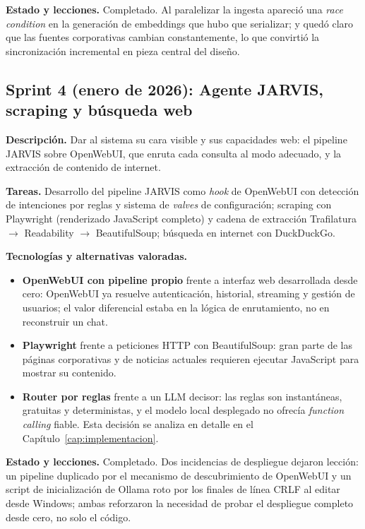 \textbf{Estado y lecciones.} Completado. Al paralelizar la ingesta apareció una \textit{race condition} en la generación de embeddings que hubo que serializar; y quedó claro que las fuentes corporativas cambian constantemente, lo que convirtió la sincronización incremental en pieza central del diseño.

\subsection{Sprint 4 (enero de 2026): Agente JARVIS, scraping y búsqueda web}

\textbf{Descripción.} Dar al sistema su cara visible y sus capacidades web: el pipeline JARVIS sobre OpenWebUI, que enruta cada consulta al modo adecuado, y la extracción de contenido de internet.

\textbf{Tareas.} Desarrollo del pipeline JARVIS como \textit{hook} de OpenWebUI con detección de intenciones por reglas y sistema de \textit{valves} de configuración; scraping con Playwright (renderizado JavaScript completo) y cadena de extracción Trafilatura $\rightarrow$ Readability $\rightarrow$ BeautifulSoup; búsqueda en internet con DuckDuckGo.

\textbf{Tecnologías y alternativas valoradas.}
\begin{itemize}
    \item \textbf{OpenWebUI con pipeline propio} frente a interfaz web desarrollada desde cero: OpenWebUI ya resuelve autenticación, historial, streaming y gestión de usuarios; el valor diferencial estaba en la lógica de enrutamiento, no en reconstruir un chat.
    \item \textbf{Playwright} frente a peticiones HTTP con BeautifulSoup: gran parte de las páginas corporativas y de noticias actuales requieren ejecutar JavaScript para mostrar su contenido.
    \item \textbf{Router por reglas} frente a un LLM decisor: las reglas son instantáneas, gratuitas y deterministas, y el modelo local desplegado no ofrecía \textit{function calling} fiable. Esta decisión se analiza en detalle en el Capítulo~\ref{cap:implementacion}.
\end{itemize}

\textbf{Estado y lecciones.} Completado. Dos incidencias de despliegue dejaron lección: un pipeline duplicado por el mecanismo de descubrimiento de OpenWebUI y un script de inicialización de Ollama roto por los finales de línea CRLF al editar desde Windows; ambas reforzaron la necesidad de probar el despliegue completo desde cero, no solo el código.

